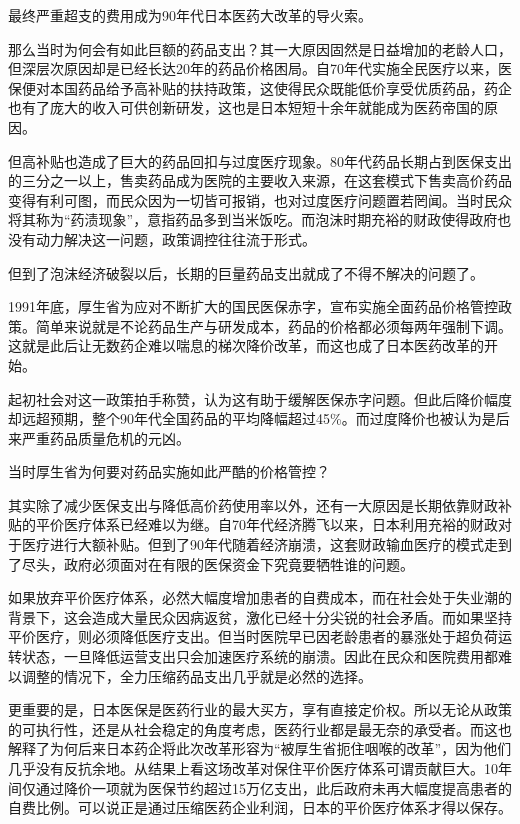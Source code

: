 最终严重超支的费用成为90年代日本医药大改革的导火索。

那么当时为何会有如此巨额的药品支出？其一大原因固然是日益增加的老龄人口，但深层次原因却是已经长达20年的药品价格困局。自70年代实施全民医疗以来，医保便对本国药品给予高补贴的扶持政策，这使得民众既能低价享受优质药品，药企也有了庞大的收入可供创新研发，这也是日本短短十余年就能成为医药帝国的原因。

但高补贴也造成了巨大的药品回扣与过度医疗现象。80年代药品长期占到医保支出的三分之一以上，售卖药品成为医院的主要收入来源，在这套模式下售卖高价药品变得有利可图，而民众因为一切皆可报销，也对过度医疗问题置若罔闻。当时民众将其称为“药渍现象”，意指药品多到当米饭吃。而泡沫时期充裕的财政使得政府也没有动力解决这一问题，政策调控往往流于形式。

但到了泡沫经济破裂以后，长期的巨量药品支出就成了不得不解决的问题了。

1991年底，厚生省为应对不断扩大的国民医保赤字，宣布实施全面药品价格管控政策。简单来说就是不论药品生产与研发成本，药品的价格都必须每两年强制下调。这就是此后让无数药企难以喘息的梯次降价改革，而这也成了日本医药改革的开始。

起初社会对这一政策拍手称赞，认为这有助于缓解医保赤字问题。但此后降价幅度却远超预期，整个90年代全国药品的平均降幅超过45\%。而过度降价也被认为是后来严重药品质量危机的元凶。

当时厚生省为何要对药品实施如此严酷的价格管控？

其实除了减少医保支出与降低高价药使用率以外，还有一大原因是长期依靠财政补贴的平价医疗体系已经难以为继。自70年代经济腾飞以来，日本利用充裕的财政对于医疗进行大额补贴。但到了90年代随着经济崩溃，这套财政输血医疗的模式走到了尽头，政府必须面对在有限的医保资金下究竟要牺牲谁的问题。

如果放弃平价医疗体系，必然大幅度增加患者的自费成本，而在社会处于失业潮的背景下，这会造成大量民众因病返贫，激化已经十分尖锐的社会矛盾。而如果坚持平价医疗，则必须降低医疗支出。但当时医院早已因老龄患者的暴涨处于超负荷运转状态，一旦降低运营支出只会加速医疗系统的崩溃。因此在民众和医院费用都难以调整的情况下，全力压缩药品支出几乎就是必然的选择。

更重要的是，日本医保是医药行业的最大买方，享有直接定价权。所以无论从政策的可执行性，还是从社会稳定的角度考虑，医药行业都是最无奈的承受者。而这也解释了为何后来日本药企将此次改革形容为“被厚生省扼住咽喉的改革”，因为他们几乎没有反抗余地。从结果上看这场改革对保住平价医疗体系可谓贡献巨大。10年间仅通过降价一项就为医保节约超过15万亿支出，此后政府未再大幅度提高患者的自费比例。可以说正是通过压缩医药企业利润，日本的平价医疗体系才得以保存。

